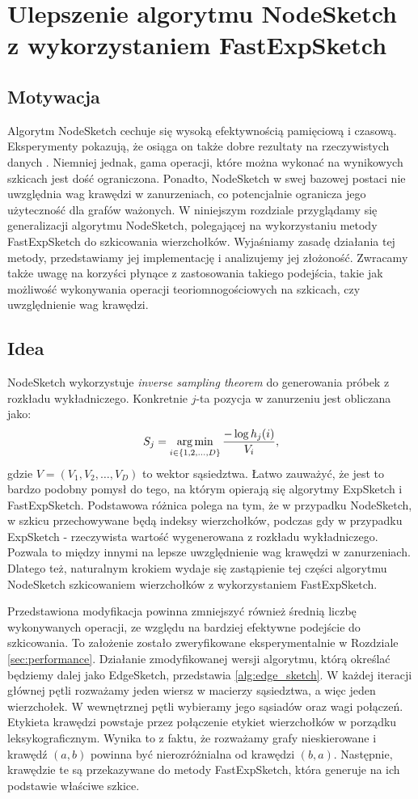 \chapter{Ulepszenie algorytmu NodeSketch z wykorzystaniem FastExpSketch}
\section{Motywacja}
    Algorytm NodeSketch cechuje się wysoką efektywnością pamięciową i czasową. Eksperymenty pokazują, że osiąga on także dobre rezultaty na rzeczywistych danych \cite{Yang_Rosso_Li_Cudre-Mauroux_2019}. 
    Niemniej jednak, gama operacji, które można wykonać na wynikowych szkicach jest dość ograniczona. Ponadto, NodeSketch w swej bazowej postaci nie uwzględnia wag krawędzi w zanurzeniach, co potencjalnie ogranicza jego użyteczność dla grafów ważonych.   
    W niniejszym rozdziale przyglądamy się generalizacji algorytmu NodeSketch, polegającej na wykorzystaniu metody FastExpSketch do szkicowania wierzchołków. Wyjaśniamy zasadę działania tej metody, przedstawiamy jej implementację i analizujemy jej złożoność. Zwracamy także uwagę na korzyści płynące z zastosowania takiego podejścia, takie jak możliwość wykonywania operacji teoriomnogościowych na szkicach, czy uwzględnienie wag krawędzi.

\section{Idea}
    NodeSketch wykorzystuje \textit{inverse sampling theorem} do generowania próbek z rozkładu wykładniczego. Konkretnie $j$-ta pozycja w zanurzeniu jest obliczana jako: 
    \[  
        S_j = \operatorname*{arg\,min}_{i \in \{1,2,\dots, D\}} \frac{-\log h_{j}(i)}{V_i},
    \] 
    gdzie $V = (V_1, V_2, \dots, V_D)$ to wektor sąsiedztwa. Łatwo zauważyć, że jest to bardzo podobny pomysł do tego, na którym opierają się algorytmy ExpSketch i FastExpSketch. Podstawowa różnica polega na tym, że w przypadku NodeSketch, w szkicu przechowywane będą indeksy wierzchołków, podczas gdy w przypadku ExpSketch - rzeczywista wartość wygenerowana z rozkładu wykładniczego. Pozwala to między innymi na lepsze uwzględnienie wag krawędzi w zanurzeniach. Dlatego też, naturalnym krokiem wydaje się zastąpienie tej części algorytmu NodeSketch szkicowaniem wierzchołków z wykorzystaniem FastExpSketch.

    Przedstawiona modyfikacja powinna zmniejszyć również średnią liczbę wykonywanych operacji, ze względu na bardziej efektywne podejście do szkicowania. To założenie zostało zweryfikowane eksperymentalnie w Rozdziale \ref{sec:performance}. Działanie zmodyfikowanej wersji algorytmu, którą określać będziemy dalej jako EdgeSketch, przedstawia  \ref{alg:edge_sketch}. W każdej iteracji głównej pętli rozważamy jeden wiersz w macierzy sąsiedztwa, a więc jeden  wierzchołek. W wewnętrznej pętli wybieramy jego sąsiadów oraz wagi połączeń. Etykieta krawędzi powstaje przez połączenie etykiet wierzchołków w porządku leksykograficznym. Wynika to z faktu, że rozważamy grafy nieskierowane i krawędź $(a,b)$ powinna być nierozróżnialna od krawędzi $(b,a)$. Następnie, krawędzie te są przekazywane do metody FastExpSketch, która generuje na ich podstawie właściwe szkice.  

